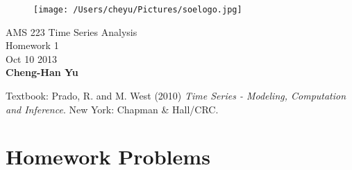 \documentclass[12pt]{article}\usepackage[]{graphicx}\usepackage[]{color}
\begin{document}
	\begin{figure}
		\begin{center}
			\texttt{[image: /Users/cheyu/Pictures/soelogo.jpg]}
		\end{center}
 	\end{figure}
 	\begin{flushright}
    	AMS 223 Time Series Analysis\\
    	Homework 1\\
    	Oct 10 2013\\
    	\textbf{Cheng-Han Yu}
 	\end{flushright}

Textbook: Prado, R. and M. West (2010) \textit{Time Series - Modeling, Computation and Inference}. New York: Chapman \& Hall/CRC.

\section{Homework Problems}
\end{document}
